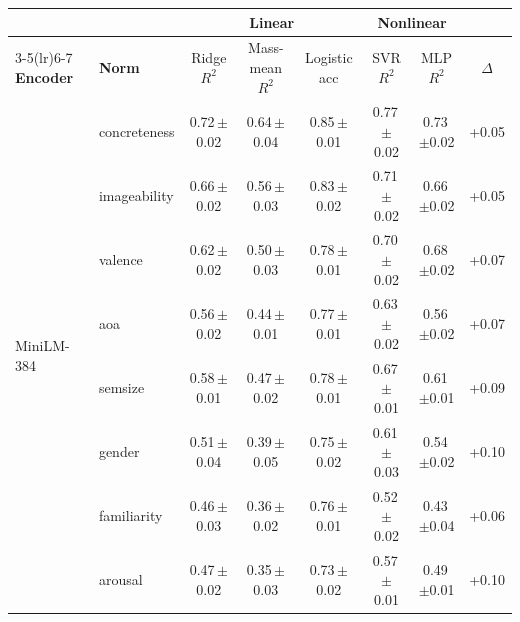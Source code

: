 \begin{table}[t]
  \centering
  \small
  \setlength{\tabcolsep}{3.5pt}
  \begin{tabular}{@{}llcccccc@{}}
    \toprule
    & & \multicolumn{3}{c}{\textbf{Linear}} & \multicolumn{2}{c}{\textbf{Nonlinear}} & \\
    \cmidrule(lr){3-5}\cmidrule(lr){6-7}
    \textbf{Encoder} & \textbf{Norm} & Ridge $R^2$ & Mass-mean $R^2$ & Logistic acc & SVR $R^2$ & MLP $R^2$ & $\Delta$ \\
    \midrule
    \multirow{9}{*}{MiniLM-384} & concreteness & 0.72\,\scriptsize$\pm$0.02 & 0.64\,\scriptsize$\pm$0.04 & 0.85\,\scriptsize$\pm$0.01 & 0.77\,\scriptsize$\pm$0.02 & 0.73\,\scriptsize$\pm$0.02 & +0.05 \\
     & imageability & 0.66\,\scriptsize$\pm$0.02 & 0.56\,\scriptsize$\pm$0.03 & 0.83\,\scriptsize$\pm$0.02 & 0.71\,\scriptsize$\pm$0.02 & 0.66\,\scriptsize$\pm$0.02 & +0.05 \\
     & valence & 0.62\,\scriptsize$\pm$0.02 & 0.50\,\scriptsize$\pm$0.03 & 0.78\,\scriptsize$\pm$0.01 & 0.70\,\scriptsize$\pm$0.02 & 0.68\,\scriptsize$\pm$0.02 & +0.07 \\
     & aoa & 0.56\,\scriptsize$\pm$0.02 & 0.44\,\scriptsize$\pm$0.01 & 0.77\,\scriptsize$\pm$0.01 & 0.63\,\scriptsize$\pm$0.02 & 0.56\,\scriptsize$\pm$0.02 & +0.07 \\
     & semsize & 0.58\,\scriptsize$\pm$0.01 & 0.47\,\scriptsize$\pm$0.02 & 0.78\,\scriptsize$\pm$0.01 & 0.67\,\scriptsize$\pm$0.01 & 0.61\,\scriptsize$\pm$0.01 & +0.09 \\
     & gender & 0.51\,\scriptsize$\pm$0.04 & 0.39\,\scriptsize$\pm$0.05 & 0.75\,\scriptsize$\pm$0.02 & 0.61\,\scriptsize$\pm$0.03 & 0.54\,\scriptsize$\pm$0.02 & +0.10 \\
     & familiarity & 0.46\,\scriptsize$\pm$0.03 & 0.36\,\scriptsize$\pm$0.02 & 0.76\,\scriptsize$\pm$0.01 & 0.52\,\scriptsize$\pm$0.02 & 0.43\,\scriptsize$\pm$0.04 & +0.06 \\
     & arousal & 0.47\,\scriptsize$\pm$0.02 & 0.35\,\scriptsize$\pm$0.03 & 0.73\,\scriptsize$\pm$0.02 & 0.57\,\scriptsize$\pm$0.01 & 0.49\,\scriptsize$\pm$0.01 & +0.10 \\

\end{tabular}
\end{table}
